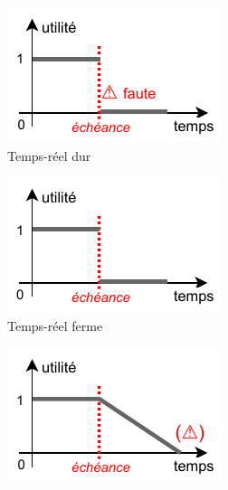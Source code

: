 \documentclass[french, a4paper, 11pt, twoside, pdftex]{StyleThese}
\begin{document}
		\begin{figure}[h]
			\centering
			\begin{subfigure}{.3\textwidth} \centering
				\includegraphics[width=\linewidth]{schemas/SdF_TempsReelDUR}
				\caption[]{Temps-réel dur}
				\label{fig:tempReelDur}
			\end{subfigure}
			\begin{subfigure}{.3\textwidth} \centering
				\includegraphics[width=\linewidth]{schemas/SdF_TempsReelFERME}
				\caption[]{Temps-réel ferme}
				\label{fig:tempReelFerme}
			\end{subfigure}
			\begin{subfigure}{.3\textwidth} \centering
				\includegraphics[width=\linewidth]{schemas/SdF_TempsReelMOU}

\end{subfigure}
\end{figure}
\end{document}
